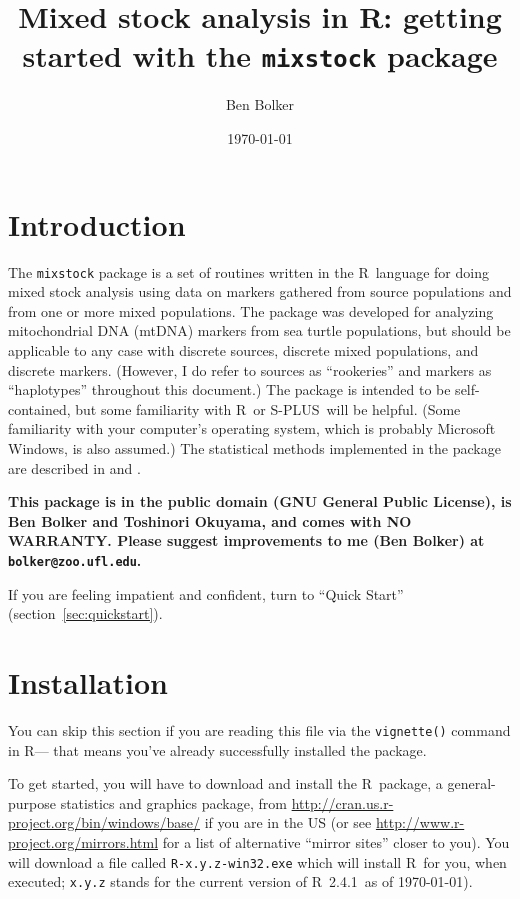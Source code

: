 \documentclass[11pt]{article}
\title{Mixed stock analysis in R: getting started with the {\tt mixstock}
package}
\author{Ben Bolker}
\date{\today}
\newcommand{\R}{{\sf R}}
\newcommand{\Splus}{{\sf S-PLUS}}
\newcommand{\Rver}{2.4.1}
\begin{document}
\maketitle

\section{Introduction}
The {\tt mixstock} package is a set of routines
written in the \R\ language
\cite{Rmanual} for doing mixed stock
analysis using
data on markers gathered
from source populations and from one or more mixed populations.
The package was developed for
analyzing mitochondrial DNA (mtDNA) markers from
sea turtle populations, but should be applicable
to any case with discrete sources, discrete mixed
populations, and discrete markers.
(However, I do refer to sources as ``rookeries''
and markers as ``haplotypes'' throughout this document.)
The package is intended to be self-contained,
but some familiarity with \R\ or \Splus\ will
be helpful.  (Some familiarity with your
computer's operating system, which is probably
Microsoft Windows, is also assumed.)
The statistical methods implemented in the
package are described in \cite{bolk+03c} and
\cite{PellMasu01}.

\textbf{This package is in the public domain (GNU General Public
License), is  Ben Bolker and
Toshinori Okuyama,
and comes with NO WARRANTY.  Please suggest improvements to
me (Ben Bolker) at {\tt bolker@zoo.ufl.edu}.}

If you are feeling impatient and confident, turn to
``Quick Start'' (section~\ref{sec:quickstart}).

\section{Installation}
You can skip this section if you are reading this
file via the {\tt vignette()} command in \R --- that
means you've already successfully installed the
package.

To get started, you will have to download and
install the \R\ package, a general-purpose
statistics and graphics package, from
\url{http://cran.us.r-project.org/bin/windows/base/}
if you are in the US
(or see \url{http://www.r-project.org/mirrors.html} for a list of alternative
``mirror sites'' closer to you).
You will download a file called {\tt R-x.y.z-win32.exe}
which will install \R\ for you, when executed; {\tt x.y.z}
stands for the current version of \R\ \Rver\ as of \today).
\end{document}
